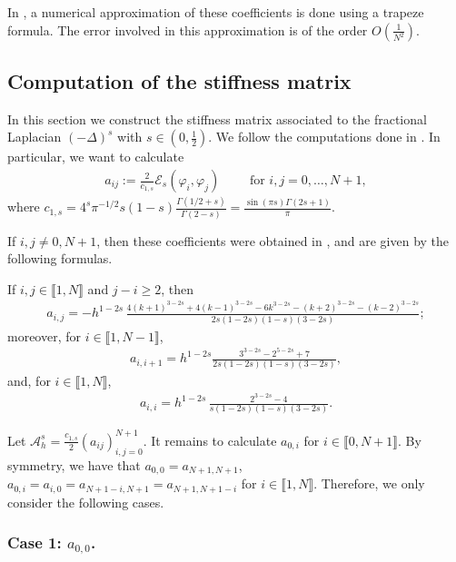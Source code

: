 \documentclass[10 pt]{article}
\newcommand\inter[1]{\llbracket #1\rrbracket}
\numberwithin{equation}{section}
\def\cE{\mathcal{E}}
\begin{document}
In \cite{L22}, a numerical approximation of these coefficients is done using a trapeze formula.  The error involved in this approximation is of the order $O(\frac{1}{N^2})$.  





\subsection{Computation of the stiffness matrix}\label{sec:s:m}

In this section we construct the stiffness matrix associated to the fractional Laplacian $(-\Delta)^s$ with $s\in(0,\frac{1}{2})$. We follow the computations done in \cite{BH17}.  In particular, we want to calculate
\begin{align*}
a_{ij}:=\frac{2}{c_{1,s}}\cE_s(\varphi_i,\varphi_j)\qquad \text{ for }i,j=0,\ldots, N+1,
\end{align*}
where $c_{1,s}=4^s\pi^{-1/2}s(1-s)\frac{\Gamma(1/2+s)}{\Gamma(2-s)}=\frac{\sin (\pi  s) \Gamma (2 s+1)}{\pi }$.

If $i,j\neq 0,N+1$, then these coefficients were obtained in \cite{BH17}, and are given by the following formulas. 

If $i,j\in\inter{1,N}$ and $j-i\geq 2$, then
\begin{align*}
	a_{i,j} = - h^{1-2s}\,\frac{4(k+1)^{3-2s} + 4(k-1)^{3-2s}-6k^{3-2s}-(k+2)^{3-2s}-(k-2)^{3-2s}}{2s(1-2s)(1-s)(3-2s)};
\end{align*} 
moreover, for $i\in\inter{1,N-1}$,
\begin{align*}
	a_{i,i+1} =	\displaystyle h^{1-2s}\frac{3^{3-2s}-2^{5-2s}+7}{2s(1-2s)(1-s)(3-2s)},
\end{align*}
and, for  $i\in\inter{1,N}$,
\begin{align*}
	a_{i,i} =
			\displaystyle h^{1-2s}\,\frac{2^{3-2s}-4}{s(1-2s)(1-s)(3-2s)}.
\end{align*}

Let $\mathcal A^s_h=\frac{c_{1,s}}{2}(a_{ij})_{i,j=0}^{N+1}$. It remains to calculate $a_{0,i}$ for $i\in\inter{0,N+1}$.  By symmetry, we have that $a_{0,0}=a_{N+1,N+1}$, $a_{0,i}=a_{i,0}=a_{N+1-i,N+1}=a_{N+1,N+1-i}$ for $i\in\inter{1,N}$. Therefore, we only consider the following cases.

\subsubsection{Case 1: $a_{0,0}$.}
\end{document}
